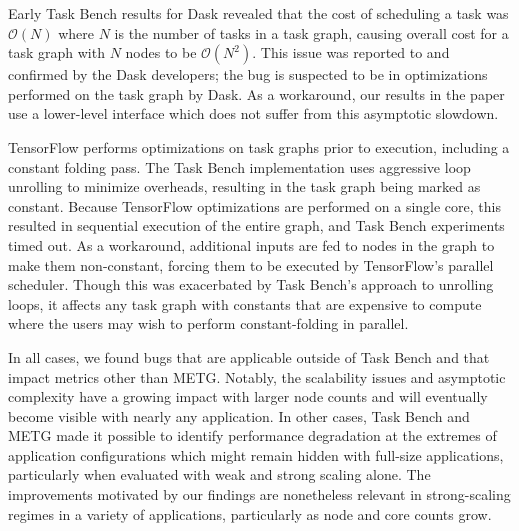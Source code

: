 Early Task Bench results for Dask revealed that the cost of scheduling
a task was $\mathcal{O}(N)$ where $N$ is the number of tasks in a task
graph, causing overall cost for a task graph with $N$ nodes to be
$\mathcal{O}(N^2)$. This issue was reported to and confirmed by the
Dask developers; the bug is suspected to be in optimizations performed
on the task graph by Dask. As a workaround, our results in the paper use a
lower-level interface which does not suffer from this asymptotic
slowdown.

TensorFlow performs optimizations on task graphs prior to execution,
including a constant folding pass. The Task Bench implementation uses
aggressive loop unrolling to minimize overheads, resulting in the task
graph being marked as constant. Because TensorFlow optimizations are
performed on a single core, this resulted in sequential execution of
the entire graph, and Task Bench experiments timed out. As a
workaround, additional inputs are fed to nodes in the graph to make
them non-constant, forcing them to be executed by TensorFlow's parallel
scheduler. Though this was exacerbated by Task Bench's approach to
unrolling loops, it affects any task graph with constants that are
expensive to compute where the users may wish to perform
constant-folding in parallel.


In all cases, we found bugs that are applicable outside of Task Bench
and that impact metrics other than METG. Notably, the scalability
issues and asymptotic complexity have a growing impact with larger
node counts and will eventually become visible with nearly any
application. In other cases, Task Bench and METG made it possible to
identify performance degradation at the extremes of application
configurations which might remain hidden with full-size applications,
particularly when evaluated with weak and strong scaling alone. The
improvements motivated by our findings are nonetheless relevant in
strong-scaling regimes in a variety of applications, particularly as
node and core counts grow.

